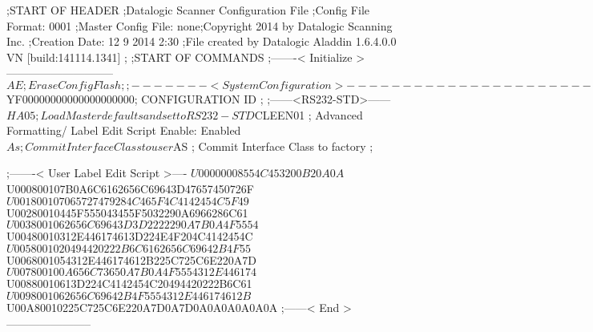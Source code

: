 ;START OF HEADER
;Datalogic Scanner Configuration File
;Config File Format: 0001
;Master Config File: none;Copyright 2014 by Datalogic Scanning Inc.
;Creation Date: 12 9 2014 2:30
;File created by Datalogic Aladdin 1.6.4.0.0 VN [build:141114.1341]
;
;START OF COMMANDS
;-------< Initialize >-----------------------------
$AE                 ; Erase Config Flash
;
;-------< System Configuration >-------------------------------
$YF00000000000000000000; CONFIGURATION ID
;
;------<RS232-STD>------
$HA05               ; Load Master defaults and set to RS232-STD
$CLEEN01            ; Advanced Formatting/ Label Edit Script Enable: Enabled
$As                 ; Commit Interface Class to user
$AS                 ; Commit Interface Class to factory
;

;-------< User Label Edit Script >----
$U00000008554C453200B20A0A
$U000800107B0A6C6162656C69643D47657450726F
$U001800107065727479284C465F4C4142454C5F49
$U00280010445F555043455F5032290A6966286C61
$U0038001062656C69643D3D2222290A7B0A4F5554
$U00480010312E446174613D224E4F204C4142454C
$U0058001020494420222B6C6162656C69642B4F55
$U0068001054312E446174612B225C725C6E220A7D
$U007800100A656C73650A7B0A4F5554312E446174
$U00880010613D224C4142454C20494420222B6C61
$U0098001062656C69642B4F5554312E446174612B
$U00A80010225C725C6E220A7D0A7D0A0A0A0A0A0A
;------< End >-----------------------
